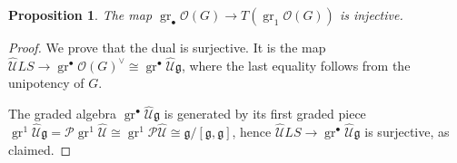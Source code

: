 \documentclass{amsart}
\newtheorem{prop}[thm]{Proposition}
\theoremstyle{definition}
\theoremstyle{remark}
\theoremstyle{remark}
\newcommand{\ra}{\rightarrow}
\newcommand{\mcO}{\mathcal{O}}
\newcommand{\mcP}{\mathcal{P}}
\newcommand{\mcU}{\mathcal{U}}
\newcommand{\mfg}{\mathfrak{g}}
\DeclareMathOperator{\gr}{gr}
\begin{document}
\begin{prop}
The map $\gr_\bullet\mcO(G)\ra T(\gr_1\mcO(G))$ is injective.
\end{prop}

\begin{proof}
We prove that the dual is surjective. It is the map $\hat{\mcU}LS\ra\gr^\bullet\mcO(G)^\vee\cong\gr^\bullet \hat{\mcU}\mfg$, where the last equality follows from the unipotency of $G$.

The graded algebra $\gr^\bullet \hat{\mcU}\mfg$ is generated by its first graded piece $\gr^1 \hat{\mcU}\mfg=\mcP\gr^1\hat{\mcU}\cong\gr^1\mcP\hat{\mcU}\cong\mfg/[\mfg,\mfg]$, hence $ \hat{\mcU}LS\ra\gr^\bullet \hat{\mcU}\mfg$ is surjective, as claimed.
\end{proof}








 
 
 
 
\end{document}
